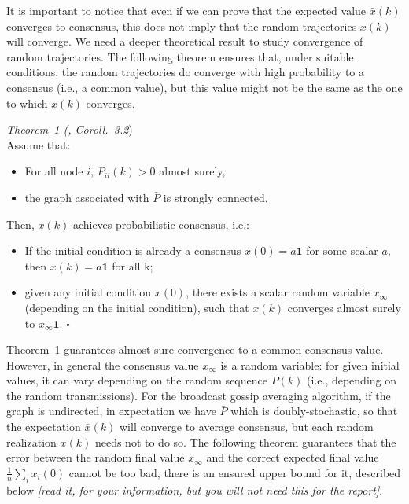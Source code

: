 \documentclass[oneside]{article}
\begin{document}



It is important to notice that even if we can prove that the expected value $\bar x(k)$ converges to consensus, this does not imply that the random trajectories $x(k)$ will converge.
We need a deeper theoretical result to study convergence of random trajectories. The following theorem ensures that, under suitable conditions, the random trajectories do converge with high probability to a consensus (i.e., a common value), but this value might not be the same as the one to which $\bar x(k)$ converges.

	\textit{Theorem~1 (\cite{gossip-converg-as}, Coroll.~3.2})\\
	Assume that:
		\begin{itemize}
		\item For all node $i$, $P_{ii}(k)>0$ almost surely,
		\item the graph associated with $\bar P$ is strongly connected.
		\end{itemize}
	Then, $x(k)$ achieves probabilistic consensus, i.e.:
		\begin{itemize}
		\item If the initial condition is already a consensus $x(0) = a \mathbf 1$ for some scalar $a$, then
		$x(k) = a \mathbf 1$ for all k;
		\item given any initial condition $x(0)$, there exists a scalar random variable $x_{\infty}$ (depending on the initial condition), such that $x(k)$ converges almost surely to $x_{\infty} \mathbf 1$. 	\hfill $\square$ 
		\end{itemize}


	 Theorem~1 guarantees almost sure convergence to a common consensus value. However, in general the consensus value $x_{\infty}$ is a random variable: for given initial values, it can vary depending on the random sequence $P(k)$ (i.e., depending on the random transmissions). For the broadcast gossip averaging algorithm, if the graph is undirected, in expectation we have $\bar P$ which is doubly-stochastic, so that the expectation $\bar x(k)$ will converge to average consensus, but each random realization $x(k)$ needs not to do so. The following theorem guarantees that the error between the random final value $x_{\infty}$ and the correct expected final value $\frac{1}{n}\sum_i x_i(0)$ cannot be too bad, there is an ensured upper bound for it, described below \textit{[read it, for your information, but you will not need this for the report]}.
\end{document}
